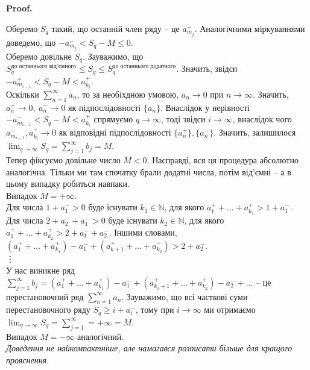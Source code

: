 \documentclass[a4paper, 10pt]{article}
\makeatletter
\theoremstyle{theoremdd}
\theoremstyle{theoremdd}
\theoremstyle{theoremdd}
\theoremstyle{theoremdd}
\theoremstyle{theoremdd}
\theoremstyle{theoremdd}
\theoremstyle{theoremdd}
\theoremstyle{theoremdd}
\theoremstyle{theoremdd}
\renewenvironment{proof}[1][Proof.\\]{\par
\pushQED{\hfill \qed}%
\normalfont \topsep6\p@\@plus6\p@\relax
\trivlist
\item\relax
{\bfseries
#1\@addpunct{.}}\hspace\labelsep\ignorespaces
}{%
\popQED\endtrivlist\@endpefalse
}
\makeatother
\begin{document}
\begin{proof}
Оберемо $S_q$ такий, що останній член ряду -- це $a_{m_j}^-$. Аналогічними міркуваннями доведемо, що $-a_{m_j}^- < S_q - M \leq 0$.\\
Оберемо довільне $S_q$. Зауважимо, що $S^{\text{до останнього від'ємного}}_{q} \leq S_q \leq S_q^{\text{до останнього додатного}}$. Значить, звідси\\
$-a_{m_{i-1}}^+ < S_q - M < a_{k_i}^+$.\\
Оскільки $\displaystyle\sum_{n=1}^\infty a_n$, то за необіхдною умовою, $a_n \to 0$ при $n \to \infty$. Значить, $a_n^+ \to 0,\ a_n^- \to 0$ як підпослідовності $\{a_n\}$. Внаслідок у нерівності $-a_{m_{i-1}}^- < S_q - M < a_{k_i}^+$ спрямуємо $q \to \infty$, тоді звідси $i \to \infty$, внаслідок чого $a_{m_{i-1}}^-, a_{k_i}^+ \to 0$ як відповідні підпослідовності $\{a_n^+\},\{a_n^-\}$. Значить, залишилося $\displaystyle\lim_{q \to \infty} S_q = \sum_{j=1}^\infty b_j = M$.
\bigskip \\
Тепер фіксуємо довільне число $M < 0$. Насправді, вся ця процедура абсолютно аналогічна. Тільки ми там спочатку брали додатні числа, потім від'ємні -- а в цьому випадку робиться навпаки.
\bigskip \\
Випадок $M = +\infty$.\\
Для числа $1 + a_1^- > 0$ буде існувати $k_1 \in \mathbb{N}$, для якого $a_1^+ + \dots + a_{k_1}^+ > 1 + a_1^-$.\\
Для числа $2 + a_2^- + a_1^- > 0$ буде існувати $k_2 \in \mathbb{N}$, для якого $a_{1}^+ + \dots + a_{k_2}^+ > 2 + a_1^- + a_2^-$. Іншими словами, $(a_1^+ + \dots + a_{k_1}^+) - a_1^- + (a_{k+1}^+ + \dots + a_{k_2}^+) > 2 + a_2^-$.\\
\vdots \\
У нас виникне ряд $\displaystyle\sum_{j=1}^\infty b_j = (a_1^+ + \dots + a_{k_1}^+) - a_1^- + (a_{k_1+1}^+ + \dots + a_{k_2}^+) - a_2^- + \dots$ -- це перестановочний ряд $\displaystyle\sum_{n=1}^\infty a_n$. Зауважимо, що всі часткові суми перестановочного ряду $S_q \geq i + a_i^-$, тому при $i \to \infty$ ми отримаємо $\displaystyle\lim_{q \to \infty} S_q = \sum_{j=1}^\infty = +\infty = M$.
\bigskip \\
Випадок $M = -\infty$ аналогічний.\\
\textit{Доведення не найкомпактніше, але намагався розписати більше для кращого прояснення.}
\end{proof}
\end{document}
